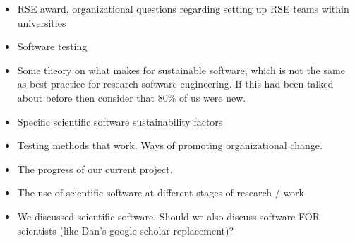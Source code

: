 \begin{itemize}
\item RSE award, organizational questions regarding setting up RSE teams within universities
\item Software testing
\item Some theory on what makes for sustainable software, which is not the same as best practice for research software engineering. If this had been talked about before then consider that 80\% of us were new.
\item Specific scientific software sustainability factors
\item Testing methods that work. Ways of promoting organizational change.
\item The progress of our current project.
\item The use of scientific software at different stages of research / work 
\item We discussed scientific software. Should we also discuss software FOR scientists (like Dan's google scholar replacement)?
\end{itemize}


